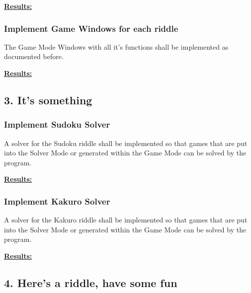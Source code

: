 \documentclass{article}
\begin{document}
	\begin{framed}
		\textbf{\underline{Results:}}\\
	\end{framed}
	
	\subsubsection*{Implement Game Windows for each riddle}
	
	The Game Mode Windows with all it's functions shall be implemented as documented before.
	
	\begin{framed}
		\textbf{\underline{Results:}}\\
	\end{framed}

	\newpage
	
	\subsection*{3. It's something}
	
	\subsubsection*{Implement Sudoku Solver}
	
	A solver for the Sudoku riddle shall be implemented so that games that are put into the Solver Mode or generated within the Game Mode can be solved by the program.
	
	\begin{framed}
		\textbf{\underline{Results:}}\\
	\end{framed}

	\subsubsection*{Implement Kakuro Solver}
	
	A solver for the Kakuro riddle shall be implemented so that games that are put into the Solver Mode or generated within the Game Mode can be solved by the program.
	
	\begin{framed}
		\textbf{\underline{Results:}}\\
	\end{framed}

	\newpage
	
	\subsection*{4. Here's a riddle, have some fun}
	
\end{document}
